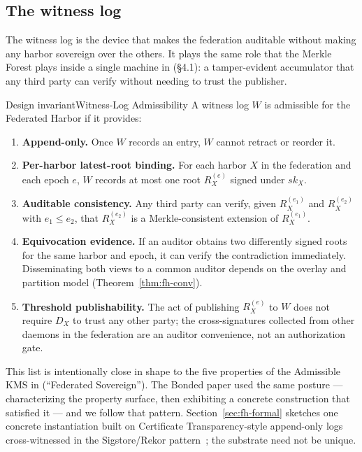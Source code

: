 \documentclass[11pt,a4paper]{article}
\theoremstyle{definition}
\theoremstyle{remark}
\begin{document}
\subsection{The witness log}\label{sec:fh-witness}
The witness log is the device that makes the federation auditable without making any harbor sovereign over the others. It plays the same role that the Merkle Forest plays inside a single machine in  (\S4.1): a tamper-evident accumulator that any third party can verify without needing to trust the publisher.
\begin{pdclaim}{Design invariant}{Witness-Log Admissibility}
\setlength{\parskip}{4pt plus 1pt}
\label{prop:fh-witness}
A witness log $W$ is admissible for the Federated Harbor if it provides:
\begin{enumerate}[nosep]
\item \textbf{Append-only.} Once $W$ records an entry, $W$ cannot retract or reorder it.
\item \textbf{Per-harbor latest-root binding.} For each harbor $X$ in the federation and each epoch $e$, $W$ records at most one root $R_X^{(e)}$ signed under $\mathit{sk}_X$.
\item \textbf{Auditable consistency.} Any third party can verify, given $R_X^{(e_1)}$ and $R_X^{(e_2)}$ with $e_1 \le e_2$, that $R_X^{(e_2)}$ is a Merkle-consistent extension of $R_X^{(e_1)}$.
\item \textbf{Equivocation evidence.} If an auditor obtains two differently signed roots for the same harbor and epoch, it can verify the contradiction immediately. Disseminating both views to a common auditor depends on the overlay and partition model (Theorem~\ref{thm:fh-conv}).
\item \textbf{Threshold publishability.} The act of publishing $R_X^{(e)}$ to $W$ does not require $D_X$ to trust any other party; the cross-signatures collected from other daemons in the federation are an auditor convenience, not an authorization gate.
\end{enumerate}
\end{pdclaim}
This list is intentionally close in shape to the five properties of the Admissible KMS in  (``Federated Sovereign''). The Bonded paper used the same posture --- characterizing the property surface, then exhibiting a concrete construction that satisfied it --- and we follow that pattern. Section~\ref{sec:fh-formal} sketches one concrete instantiation built on Certificate Transparency-style append-only logs~ cross-witnessed in the Sigstore/Rekor pattern~; the substrate need not be unique.
\end{document}
